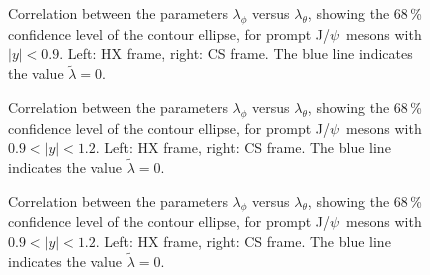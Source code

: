 \documentclass[12pt]{article}
\newcommand{\JPsi}{J/$\psi$}
\begin{document}


\begin{figure}[htb]
\centering
{}
\caption{Correlation between the parameters $\lambda_\phi$ versus
  $\lambda_\theta$, showing the 68\,\% confidence level of the contour
  ellipse, for prompt \JPsi\ mesons with $|y| < 0.9$. Left: HX frame, right: CS
  frame. The blue line indicates the value $\tilde{\lambda} = 0$.}
\end{figure}
\clearpage


\begin{figure}[htb]
\centering
{}
\caption{Correlation between the parameters $\lambda_\phi$ versus
  $\lambda_\theta$, showing the 68\,\% confidence level of the contour
  ellipse, for prompt \JPsi\ mesons with $0.9 < |y| < 1.2$. Left: HX
  frame, right: CS frame. The blue line indicates the value
  $\tilde{\lambda} = 0$.}
\end{figure}
\clearpage

\begin{figure}[htb]
\centering
{}
\caption{Correlation between the parameters $\lambda_\phi$ versus
  $\lambda_\theta$, showing the 68\,\% confidence level of the contour
  ellipse, for prompt \JPsi\ mesons with $0.9 < |y| < 1.2$. Left: HX
  frame, right: CS frame. The blue line indicates the value
  $\tilde{\lambda} = 0$.}
\end{figure}
\clearpage
\end{document}

